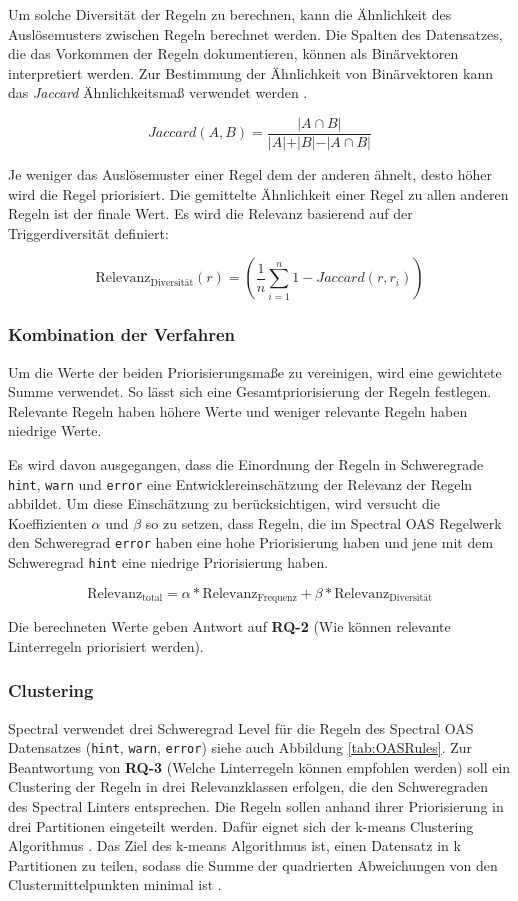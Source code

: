 Um solche Diversität der Regeln zu berechnen, kann die Ähnlichkeit des Auslösemusters zwischen Regeln berechnet werden. Die Spalten des Datensatzes, die das Vorkommen der Regeln dokumentieren, können als Binärvektoren interpretiert werden. Zur Bestimmung der Ähnlichkeit von Binärvektoren kann das \textit{Jaccard} Ähnlichkeitsmaß verwendet werden \parencite{mehrotra_anomaly_2017}.

\[
Jaccard(A,B)=\frac{\vert A \cap B \vert}{\vert A \vert + \vert B \vert - \vert A \cap B \vert}
\]

Je weniger das Auslösemuster einer Regel dem der anderen ähnelt, desto höher wird die Regel priorisiert. Die gemittelte Ähnlichkeit einer Regel zu allen anderen Regeln ist der finale Wert. Es wird die Relevanz basierend auf der Triggerdiversität definiert:

\[
\text{Relevanz}_\text{Diversität}(r) = (\frac{1}{n} \sum_{i=1}^{n} 1- Jaccard(r, r_i))
\]

\subsubsection{Kombination der Verfahren} \label{sec:kombinationderpriorisierungen}
Um die Werte der beiden Priorisierungsmaße zu vereinigen, wird eine gewichtete Summe verwendet. So lässt sich eine Gesamtpriorisierung der Regeln festlegen. Relevante Regeln haben höhere Werte und weniger relevante Regeln haben niedrige Werte.

Es wird davon ausgegangen, dass die Einordnung der Regeln in Schweregrade \texttt{hint}, \texttt{warn} und \texttt{error} eine Entwicklereinschätzung der Relevanz der Regeln abbildet. Um diese Einschätzung zu berücksichtigen, wird versucht die Koeffizienten $\alpha$ und $\beta$ so zu setzen, dass Regeln, die im Spectral \acs{OAS} Regelwerk den Schweregrad \texttt{error} haben eine hohe Priorisierung haben und jene mit dem Schweregrad \texttt{hint} eine niedrige Priorisierung haben.

\[
\text{Relevanz}_\text{total} = \alpha * \text{Relevanz}_\text{Frequenz} + \beta  * \text{Relevanz}_\text{Diversität}
\]

Die berechneten Werte geben Antwort auf \textbf{RQ-2} (Wie können relevante Linterregeln priorisiert werden).


\subsubsection{Clustering} \label{sec:clustering}
Spectral verwendet drei Schweregrad Level für die Regeln des Spectral \acs{OAS} Datensatzes (\texttt{hint}, \texttt{warn}, \texttt{error}) siehe auch Abbildung \ref{tab:OASRules}. Zur Beantwortung von \textbf{RQ-3} (Welche Linterregeln können empfohlen werden) soll ein Clustering der Regeln in drei Relevanzklassen erfolgen, die den Schweregraden des Spectral Linters entsprechen. Die Regeln sollen anhand ihrer Priorisierung in drei Partitionen eingeteilt werden. Dafür eignet sich der k-means Clustering Algorithmus \parencite{bishop_pattern_2006}. Das Ziel des k-means Algorithmus ist, einen Datensatz in k Partitionen zu teilen, sodass die Summe der quadrierten Abweichungen von den Clustermittelpunkten minimal ist \parencite{bishop_pattern_2006}.


